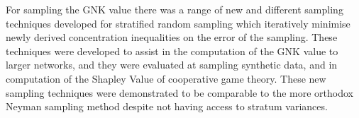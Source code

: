 For sampling the GNK value there was a range of new and different sampling techniques developed for stratified random sampling which iteratively minimise newly derived concentration inequalities on the error of the sampling.
These techniques were developed to assist in the computation of the GNK value to larger networks, and they were evaluated at sampling synthetic data, and in computation of the Shapley Value of cooperative game theory.
These new sampling techniques were demonstrated to be comparable to the more orthodox Neyman sampling method despite not having access to stratum variances.



